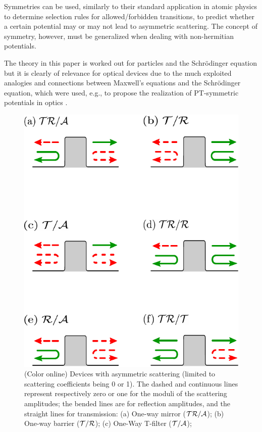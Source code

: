 Symmetries can be used, similarly to their standard application in atomic physics to determine selection rules for allowed/forbidden
transitions,
to predict whether a certain potential may or may not lead to asymmetric
scattering. The concept of symmetry, however, must be generalized when dealing with non-hermitian potentials.

The theory in this paper is worked out for particles and the Schr\"odinger equation but it is clearly of relevance for optical devices
due to the much exploited analogies and connections between Maxwell's equations and the Schr\"odinger equation,
which were used, e.g., to propose  the realization of PT-symmetric potentials in optics \cite{Ruschhaupt2005}.


\begin{figure}
  \includegraphics[width = 0.9\columnwidth]{Figures/PotentialCasesPT.pdf}
  \caption{(Color online) Devices with asymmetric scattering (limited to scattering coefficients being 0 or 1).  The dashed and continuous lines represent respectively zero or one
  for the moduli of the scattering amplitudes; the bended lines are for reflection amplitudes, and the straight lines for transmission:
  (a) One-way mirror ($\cal{TR/A}$); (b) One-way barrier ($\cal{T/R}$); (c) One-Way T-filter ($\cal{T/A}$);
}
\end{figure}
